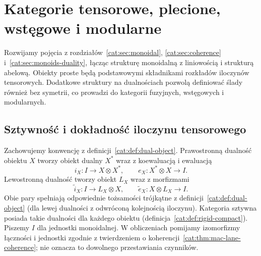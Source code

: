 \section{Kategorie tensorowe, plecione, wstęgowe i modularne}\label{cat:sec:tensor-fusion-modular}

Rozwijamy pojęcia z rozdziałów~\ref{cat:sec:monoidal}, \ref{cat:sec:coherence} i~\ref{cat:sec:monoids-duality}, łącząc strukturę monoidalną z liniowością i strukturą abelową. Obiekty proste będą podstawowymi składnikami rozkładów iloczynów tensorowych. Dodatkowe struktury na dualnościach pozwolą definiować ślady również bez symetrii, co prowadzi do kategorii fuzyjnych, wstęgowych i modularnych.

\subsection{Sztywność i dokładność iloczynu tensorowego}

Zachowujemy konwencję z definicji~\ref{cat:def:dual-object}. Prawostronną dualność obiektu $X$ tworzy obiekt dualny $X^*$ wraz z koewaluacją i ewaluacją
\[
 i_X:I\to X\otimes X^*,\qquad e_X:X^*\otimes X\to I.
\]
Lewostronną dualność tworzy obiekt $L_X$ wraz z morfizmami
\[
 \widetilde i_X:I\to L_X\otimes X,\qquad
 \widetilde e_X:X\otimes L_X\to I.
\]
Obie pary spełniają odpowiednie tożsamości trójkątne z definicji~\ref{cat:def:dual-object} (dla lewej dualności z odwróconą kolejnością iloczynu). Kategoria sztywna posiada takie dualności dla każdego obiektu (definicja~\ref{cat:def:rigid-compact}). Piszemy $I$ dla jednostki monoidalnej. W obliczeniach pomijamy izomorfizmy łączności i jednostki zgodnie z twierdzeniem o koherencji~\ref{cat:thm:mac-lane-coherence}; nie oznacza to dowolnego przestawiania czynników.

